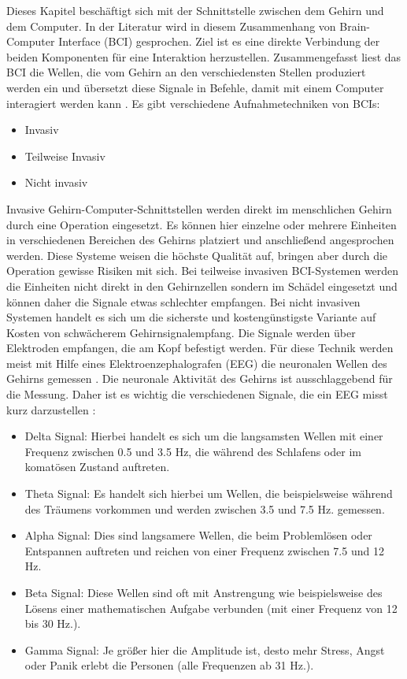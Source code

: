 Dieses Kapitel beschäftigt sich mit der Schnittstelle zwischen dem Gehirn und dem Computer. In der Literatur wird in diesem Zusammenhang von Brain-Computer Interface (BCI) gesprochen. Ziel ist es eine direkte Verbindung der beiden Komponenten für eine Interaktion herzustellen. Zusammengefasst liest das BCI die Wellen, die vom Gehirn an den verschiedensten Stellen produziert werden ein und übersetzt diese Signale in Befehle, damit mit einem Computer interagiert werden kann \cite{BRAIN}.
\newline \newline
Es gibt verschiedene Aufnahmetechniken von BCIs:
\begin{itemize}
      \item Invasiv
      \item Teilweise Invasiv
			\item Nicht invasiv
\end{itemize}
\newline
Invasive Gehirn-Computer-Schnittstellen werden direkt im menschlichen Gehirn durch eine Operation eingesetzt. Es können hier einzelne oder mehrere Einheiten in verschiedenen Bereichen des Gehirns platziert und anschließend angesprochen werden. Diese Systeme weisen die höchste Qualität auf, bringen aber durch die Operation gewisse Risiken mit sich.
Bei teilweise invasiven BCI-Systemen werden die Einheiten nicht direkt in den Gehirnzellen sondern im Schädel eingesetzt und können daher die Signale etwas schlechter empfangen. Bei nicht invasiven Systemen handelt es sich um die sicherste und kostengünstigste Variante auf Kosten von schwächerem Gehirnsignalempfang. Die Signale werden über Elektroden empfangen, die am Kopf befestigt werden. Für diese Technik werden meist mit Hilfe eines Elektroenzephalografen (EEG) die neuronalen Wellen des Gehirns gemessen \cite{BRAIN}.
\newline \newline
Die neuronale Aktivität des Gehirns ist ausschlaggebend für die Messung. Daher ist es wichtig die verschiedenen Signale, die ein EEG misst kurz darzustellen \cite{BRAIN}:
\begin{itemize}
      \item Delta Signal: Hierbei handelt es sich um die langsamsten Wellen mit einer Frequenz zwischen 0.5 und 3.5 Hz, die während des Schlafens oder im komatösen Zustand auftreten.
      \item Theta Signal: Es handelt sich hierbei um Wellen, die beispielsweise während des Träumens vorkommen und werden zwischen 3.5 und 7.5 Hz. gemessen.
			\item Alpha Signal: Dies sind langsamere Wellen, die beim Problemlösen oder Entspannen auftreten und reichen von einer Frequenz zwischen 7.5 und 12 Hz.
			\item Beta Signal: Diese Wellen sind oft mit Anstrengung wie beispielsweise des Lösens einer mathematischen Aufgabe verbunden (mit einer Frequenz von 12 bis 30 Hz.).
      \item Gamma Signal: Je größer hier die Amplitude ist, desto mehr Stress, Angst oder Panik erlebt die Personen (alle Frequenzen ab 31 Hz.).
\end{itemize}
